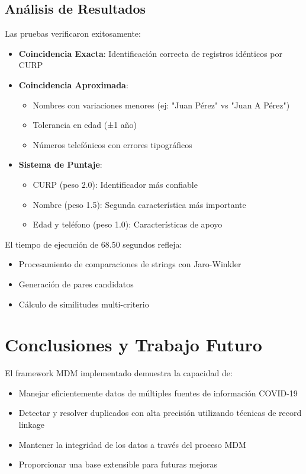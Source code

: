 \documentclass[12pt]{article}
\begin{document}
\subsection{Análisis de Resultados}

Las pruebas verificaron exitosamente:

\begin{itemize}
    \item \textbf{Coincidencia Exacta}: Identificación correcta de registros idénticos por CURP
    \item \textbf{Coincidencia Aproximada}: 
    \begin{itemize}
        \item Nombres con variaciones menores (ej: "Juan Pérez" vs "Juan A Pérez")
        \item Tolerancia en edad (±1 año)
        \item Números telefónicos con errores tipográficos
    \end{itemize}
    \item \textbf{Sistema de Puntaje}: 
    \begin{itemize}
        \item CURP (peso 2.0): Identificador más confiable
        \item Nombre (peso 1.5): Segunda característica más importante
        \item Edad y teléfono (peso 1.0): Características de apoyo
    \end{itemize}
\end{itemize}

El tiempo de ejecución de 68.50 segundos refleja:
\begin{itemize}
    \item Procesamiento de comparaciones de strings con Jaro-Winkler
    \item Generación de pares candidatos
    \item Cálculo de similitudes multi-criterio
\end{itemize}

\section{Conclusiones y Trabajo Futuro}
\label{sec:conclusiones}

El framework MDM implementado demuestra la capacidad de:

\begin{itemize}
    \item Manejar eficientemente datos de múltiples fuentes de información COVID-19
    \item Detectar y resolver duplicados con alta precisión utilizando técnicas de record linkage
    \item Mantener la integridad de los datos a través del proceso MDM
    \item Proporcionar una base extensible para futuras mejoras
\end{itemize}
\end{document}
